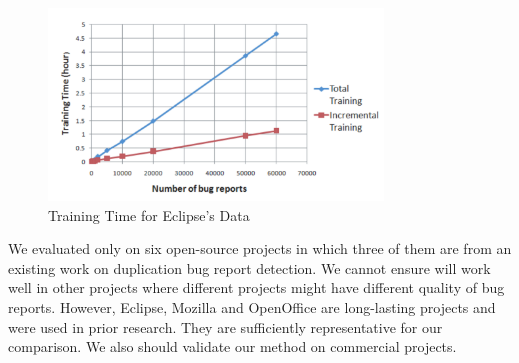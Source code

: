 \begin{figure}[t]
\centering
\includegraphics[width=3.5in]{time}
\caption{Training Time for Eclipse's Data}
\label{time}
\end{figure}






\vspace{0.04in}
  We evaluated only on six
open-source projects in which three of them are from an existing work
on duplication bug report detection. We cannot ensure {\model} will
work well in other projects where different projects might have
different quality of bug reports.  However, Eclipse, Mozilla and
OpenOffice are long-lasting projects and were used in prior
research. They are sufficiently representative for our comparison. We
also should validate our method on commercial projects.

%








